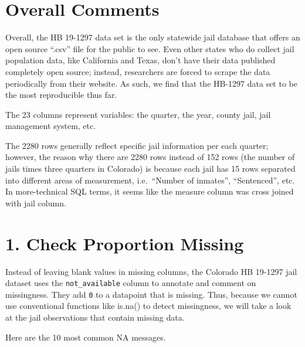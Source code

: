 \documentclass[
]{article}
\newenvironment{Shaded}{\begin{snugshade}}{\end{snugshade}}
\newcommand{\DecValTok}[1]{\textcolor[rgb]{0.00,0.00,0.81}{#1}}
\newcommand{\KeywordTok}[1]{\textcolor[rgb]{0.13,0.29,0.53}{\textbf{#1}}}
\newcommand{\NormalTok}[1]{#1}
\newcommand{\OperatorTok}[1]{\textcolor[rgb]{0.81,0.36,0.00}{\textbf{#1}}}
\newcommand{\StringTok}[1]{\textcolor[rgb]{0.31,0.60,0.02}{#1}}
\begin{document}
\hypertarget{overall-comments}{%
\section{Overall Comments}\label{overall-comments}}

Overall, the HB 19-1297 data set is the only statewide jail database
that offers an open source ``.csv'' file for the public to see. Even
other states who do collect jail population data, like California and
Texas, don't have their data published completely open source; instead,
researchers are forced to scrape the data periodically from their
website. As such, we find that the HB-1297 data set to be the most
reproducible thus far.

The 23 columns represent variables: the quarter, the year, county jail,
jail management system, etc.

The 2280 rows generally reflect specific jail information per each
quarter; however, the reason why there are 2280 rows instead of 152 rows
(the number of jails times three quarters in Colorado) is because each
jail has 15 rows separated into different areas of measurement,
i.e.~``Number of inmates'', ``Sentenced'', etc. In more-technical SQL
terms, it seems like the measure column was cross joined with jail
column.

\hypertarget{check-proportion-missing}{%
\section{1. Check Proportion Missing}\label{check-proportion-missing}}

Instead of leaving blank values in missing columns, the Colorado HB
19-1297 jail dataset uses the \texttt{not\_available} column to annotate
and comment on missingness. They add \texttt{0} to a datapoint that is
missing. Thus, because we cannot use conventional functions like is.na()
to detect missingness, we will take a look at the jail observations that
contain missing data.

Here are the 10 most common NA messages.

\begin{Shaded}
\end{Shaded}
\end{document}
